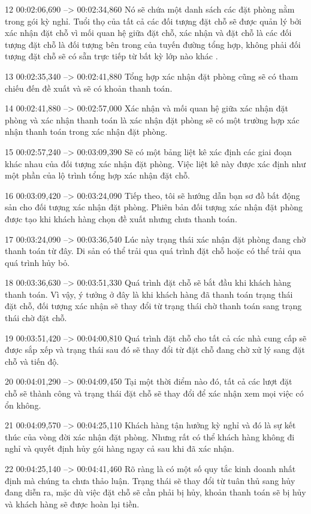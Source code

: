12
00:02:06,690 --> 00:02:34,860
Nó sẽ chứa một danh sách các đặt phòng nằm trong gói kỳ nghỉ.  Tuổi thọ của tất cả các đối tượng đặt chỗ sẽ được quản lý bởi xác nhận đặt chỗ vì mối quan hệ giữa đặt chỗ, xác nhận và đặt chỗ là các đối tượng đặt chỗ là đối tượng bên trong của tuyến đường tổng hợp, không phải đối tượng đặt chỗ sẽ có sẵn trực tiếp từ bất kỳ lớp nào khác  .

13
00:02:35,340 --> 00:02:41,880
Tổng hợp xác nhận đặt phòng cũng sẽ có tham chiếu đến đề xuất và sẽ có khoản thanh toán.

14
00:02:41,880 --> 00:02:57,000
Xác nhận và mối quan hệ giữa xác nhận đặt phòng và xác nhận thanh toán là xác nhận đặt phòng sẽ có một trường hợp xác nhận thanh toán trong xác nhận đặt phòng.

15
00:02:57,240 --> 00:03:09,390
Sẽ có một bảng liệt kê xác định các giai đoạn khác nhau của đối tượng xác nhận đặt phòng.  Việc liệt kê này được xác định như một phần của lộ trình tổng hợp xác nhận đặt chỗ.

16
00:03:09,420 --> 00:03:24,090
Tiếp theo, tôi sẽ hướng dẫn bạn sơ đồ bất động sản cho đối tượng xác nhận đặt phòng.  Phiên bản đối tượng xác nhận đặt phòng được tạo khi khách hàng chọn đề xuất nhưng chưa thanh toán.

17
00:03:24,090 --> 00:03:36,540
Lúc này trạng thái xác nhận đặt phòng đang chờ thanh toán từ đây.  Di sản có thể trải qua quá trình đặt chỗ hoặc có thể trải qua quá trình hủy bỏ.

18
00:03:36,630 --> 00:03:51,330
Quá trình đặt chỗ sẽ bắt đầu khi khách hàng thanh toán.  Vì vậy, ý tưởng ở đây là khi khách hàng đã thanh toán trạng thái đặt chỗ, đối tượng xác nhận sẽ thay đổi từ trạng thái chờ thanh toán sang trạng thái chờ đặt chỗ.

19
00:03:51,420 --> 00:04:00,810
Quá trình đặt chỗ cho tất cả các nhà cung cấp sẽ được sắp xếp và trạng thái sau đó sẽ thay đổi từ đặt chỗ đang chờ xử lý sang đặt chỗ và tiến độ.

20
00:04:01,290 --> 00:04:09,450
Tại một thời điểm nào đó, tất cả các lượt đặt chỗ sẽ thành công và trạng thái đặt chỗ sẽ thay đổi để xác nhận xem mọi việc có ổn không.

21
00:04:09,570 --> 00:04:25,110
Khách hàng tận hưởng kỳ nghỉ và đó là sự kết thúc của vòng đời xác nhận đặt phòng.  Nhưng rất có thể khách hàng không đi nghỉ và quyết định hủy gói hàng ngay cả sau khi đã xác nhận.

22
00:04:25,140 --> 00:04:41,460
Rõ ràng là có một số quy tắc kinh doanh nhất định mà chúng ta chưa thảo luận.  Trạng thái sẽ thay đổi từ tuân thủ sang hủy đang diễn ra, mặc dù việc đặt chỗ sẽ cần phải bị hủy, khoản thanh toán sẽ bị hủy và khách hàng sẽ được hoàn lại tiền.


